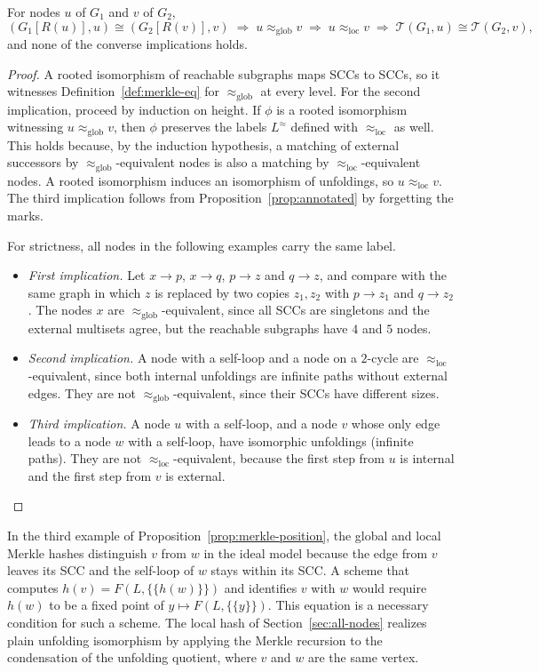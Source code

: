 \documentclass[twoside,leqno]{article}
\newcommand{\eqg}{\approx_{\mathrm{glob}}}
\newcommand{\eql}{\approx_{\mathrm{loc}}}
\newcommand{\Unf}{\mathcal{T}}
\newcommand{\Reach}{R}
\newcommand{\mset}[1]{\{\!\!\{#1\}\!\!\}}
\newcommand{\iso}{\cong}
\begin{document}
\begin{prop}
\label{prop:merkle-position}
For nodes $u$ of $G_1$ and $v$ of $G_2$,
\[
(G_1[\Reach(u)],u)\iso(G_2[\Reach(v)],v) \;\Rightarrow\; u\eqg v \;\Rightarrow\; u\eql v \;\Rightarrow\; \Unf(G_1,u)\iso\Unf(G_2,v),
\]
and none of the converse implications holds.
\end{prop}
\begin{proof}
A rooted isomorphism of reachable subgraphs maps SCCs to SCCs, so it witnesses Definition~\ref{def:merkle-eq} for $\eqg$ at every level. For the second implication, proceed by induction on height. If $\phi$ is a rooted isomorphism witnessing $u\eqg v$, then $\phi$ preserves the labels $L^{\approx}$ defined with $\eql$ as well. This holds because, by the induction hypothesis, a matching of external successors by $\eqg$-equivalent nodes is also a matching by $\eql$-equivalent nodes. A rooted isomorphism induces an isomorphism of unfoldings, so $u\eql v$. The third implication follows from Proposition~\ref{prop:annotated} by forgetting the marks.

For strictness, all nodes in the following examples carry the same label.
\begin{itemize}
  \item \emph{First implication.} Let $x\to p$, $x\to q$, $p\to z$ and $q\to z$, and compare with the same graph in which $z$ is replaced by two copies $z_1,z_2$ with $p\to z_1$ and $q\to z_2$. The nodes $x$ are $\eqg$-equivalent, since all SCCs are singletons and the external multisets agree, but the reachable subgraphs have $4$ and $5$ nodes.
  \item \emph{Second implication.} A node with a self-loop and a node on a $2$-cycle are $\eql$-equivalent, since both internal unfoldings are infinite paths without external edges. They are not $\eqg$-equivalent, since their SCCs have different sizes.
  \item \emph{Third implication.} A node $u$ with a self-loop, and a node $v$ whose only edge leads to a node $w$ with a self-loop, have isomorphic unfoldings (infinite paths). They are not $\eql$-equivalent, because the first step from $u$ is internal and the first step from $v$ is external.
\end{itemize}
\end{proof}

\begin{remark}
\label{rem:compositional}
In the third example of Proposition~\ref{prop:merkle-position}, the global and local Merkle hashes distinguish $v$ from $w$ in the ideal model because the edge from $v$ leaves its SCC and the self-loop of $w$ stays within its SCC. A scheme that computes $h(v)=F(L,\mset{h(w)})$ and identifies $v$ with $w$ would require $h(w)$ to be a fixed point of $y\mapsto F(L,\mset{y})$. This equation is a necessary condition for such a scheme. The local hash of Section~\ref{sec:all-nodes} realizes plain unfolding isomorphism by applying the Merkle recursion to the condensation of the unfolding quotient, where $v$ and $w$ are the same vertex.
\end{remark}
\end{document}
